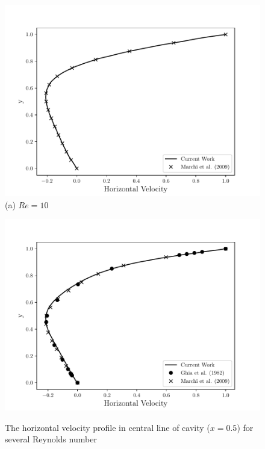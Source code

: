 \begin{center}
\begin{figure}[H]
     \caption{The horizontal velocity profile in central line of cavity ($x=0.5$) for several Reynolds number}
     \centering
     \begin{minipage}{.5\linewidth}
      \centering
      \includegraphics[scale=0.53]{./02_chaps/cap_validation/figure/Re_10_u_profile.pdf}\\
      (a) $Re=10$
     \end{minipage}%
     \begin{minipage}{.5\linewidth}
      \centering
      \includegraphics[scale=0.53]{./02_chaps/cap_validation/figure/Re_100_u_profile.pdf}\\

\end{minipage}
\end{figure}
\end{center}
